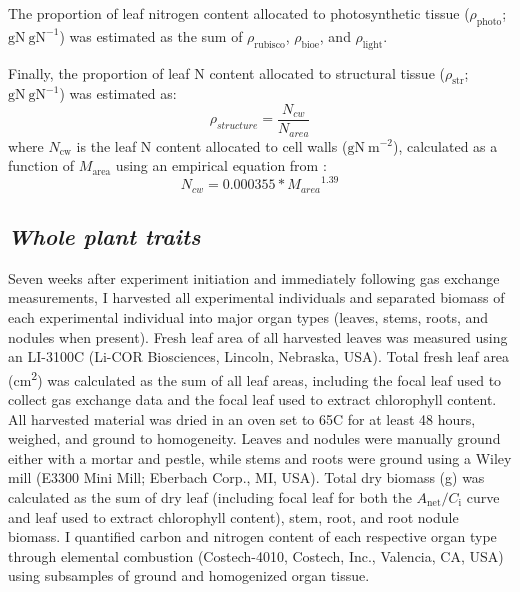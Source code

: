 The proportion of leaf nitrogen content allocated to photosynthetic tissue ($\rho_\mathrm{{photo}}$; $\mathrm{gN\ gN^{-1}}$) was estimated as the sum of $\rho_\mathrm{{rubisco}}$, $\rho_\mathrm{{bioe}}$, and $\rho_\mathrm{{light}}$.

Finally, the proportion of leaf N content allocated to structural tissue ($\rho_\mathrm{{str}}$; $\mathrm{gN\ gN^{-1}}$) was estimated as:
\begin{equation} \label{eqn_5.9}
    \rho_{structure}=\frac{N_{cw}}{N_{area}}
\end{equation}
\noindent where $N_\mathrm{cw}$ is the leaf N content allocated to cell walls ($\mathrm{gN\ m^{-2}}$), calculated as a function of $M_\mathrm{area}$ using an empirical equation from :
\begin{equation} \label{eqn_5.10}
    N_{cw}=0.000355*{M_{area}}^{1.39}
\end{equation}

\subsection{\textit{Whole plant traits}}
Seven weeks after experiment initiation and immediately following gas exchange measurements, I harvested all experimental individuals and separated biomass of each experimental individual into major organ types (leaves, stems, roots, and nodules when present). Fresh leaf area of all harvested leaves was measured using an LI-3100C (Li-COR Biosciences, Lincoln, Nebraska, USA). Total fresh leaf area (cm\textsuperscript{2}) was calculated as the sum of all leaf areas, including the focal leaf used to collect gas exchange data and the focal leaf used to extract chlorophyll content. All harvested material was dried in an oven set to 65\textdegree{}C for at least 48 hours, weighed, and ground to homogeneity. Leaves and nodules were manually ground either with a mortar and pestle, while stems and roots were ground using a Wiley mill (E3300 Mini Mill; Eberbach Corp., MI, USA). Total dry biomass (g) was calculated as the sum of dry leaf (including focal leaf for both the $A_\mathrm{{net}}/C_\mathrm{i}$ curve and leaf used to extract chlorophyll content), stem, root, and root nodule biomass. I quantified carbon and nitrogen content of each respective organ type through elemental combustion (Costech-4010, Costech, Inc., Valencia, CA, USA) using subsamples of ground and homogenized organ tissue. 

